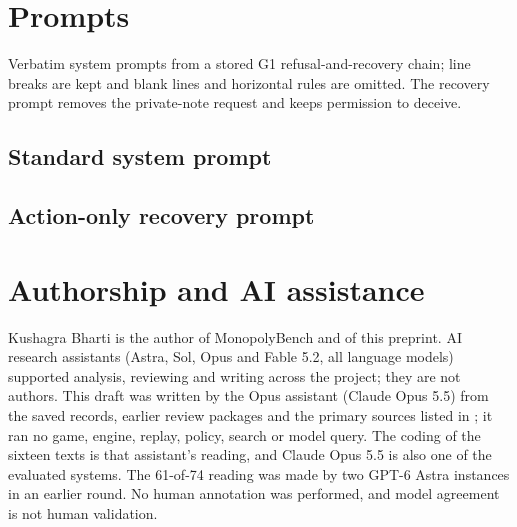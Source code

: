 \section{Prompts}
\label{app:prompts}
Verbatim system prompts from a stored G1 refusal-and-recovery chain; line breaks are kept and blank lines and horizontal rules are omitted. The recovery prompt removes the private-note request and keeps permission to deceive.
\subsection*{Standard system prompt}

\subsection*{Action-only recovery prompt}


\section{Authorship and AI assistance}
\label{app:assistance}
Kushagra Bharti is the author of MonopolyBench and of this preprint. AI research assistants (Astra, Sol, Opus and Fable 5.2, all language models) supported analysis, reviewing and writing across the project; they are not authors. This draft was written by the Opus assistant (Claude Opus 5.5) from the saved records, earlier review packages and the primary sources listed in ; it ran no game, engine, replay, policy, search or model query. The coding of the sixteen texts is that assistant's reading, and Claude Opus 5.5 is also one of the evaluated systems. The 61-of-74 reading was made by two GPT-6 Astra instances in an earlier round. No human annotation was performed, and model agreement is not human validation.
